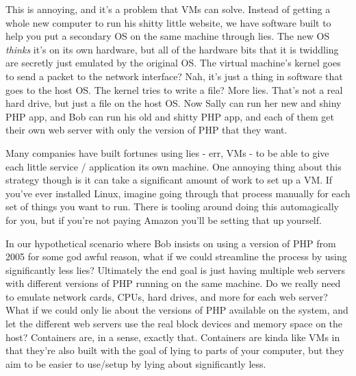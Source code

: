 \documentclass[9pt]{extarticle} %
\begin{document}
\begin{minipage}[t]{.66\linewidth}
This is annoying, and it's a problem that VMs can solve. Instead of getting a
whole new computer to run his shitty little website, we have software built to
help you put a secondary OS on the same machine through lies. The new OS
\textit{thinks} it's on its own hardware, but all of the hardware bits that
it is twiddling are secretly just emulated by the original OS. The virtual
machine's kernel goes to send a packet to the network interface? Nah, it's 
just a thing in software that goes to the host OS. The kernel tries to write a
file? More lies. That's not a real hard drive, but just a file on the host OS. 
Now Sally can run her new and shiny PHP app, and Bob can run his old and shitty
PHP app, and each of them get their own web server with only the version of PHP
that they want.

Many companies have built fortunes using lies - err, VMs - to be able to give
each little service / application its own machine. One annoying thing about
this strategy though is it can take a significant amount of work to set up a
VM. If you've ever installed Linux, imagine going through that process manually
for each set of things you want to run. There is tooling around doing this
automagically for you, but if you're not paying Amazon you'll be setting that
up yourself.

In our hypothetical scenario where Bob insists on using a version of PHP from
2005 for some god awful reason, what if we could streamline the process by
using significantly less lies? Ultimately the end goal is just having multiple
web servers with different versions of PHP running on the same machine. Do we
really need to emulate network cards, CPUs, hard drives, and more for each web
server? What if we could only lie about the versions of PHP available on the
system, and let the different web servers use the real block devices and memory
space on the host? Containers are, in a sense, exactly that. Containers are kinda
like VMs in that they're also built with the goal of lying to parts of your computer,
but they aim to be easier to use/setup by lying about significantly less.


\end{minipage} %

\newpage

\end{document}
